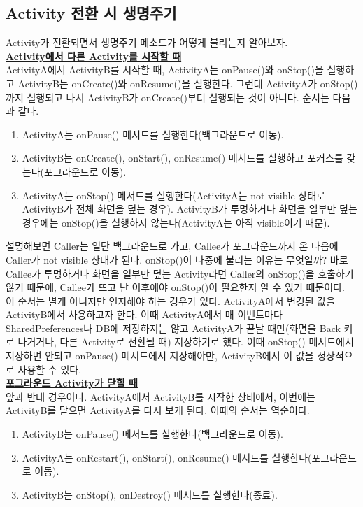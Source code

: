 \subsection{Activity 전환 시 생명주기}
Activity가 전환되면서 생명주기 메소드가 어떻게 불리는지 알아보자.\\

\underline{\bfseries Activity에서 다른 Activity를 시작할 때}\\
ActivityA에서 ActivityB를 시작할 때, ActivityA는 onPause()와 onStop()을 실행하고
ActivityB는 onCreate()와 onResume()을 실행한다.
그런데 ActivityA가 onStop()까지 실행되고 나서 ActivityB가 onCreate()부터 실행되는 것이 아니다.
순서는 다음과 같다.
\begin{enumerate}
\item ActivityA는 onPause() 메서드를 실행한다(백그라운드로 이동).
\item ActivityB는 onCreate(), onStart(), onResume() 메서드를 실행하고 포커스를 갖는다(포그라운드로 이동).
\item ActivityA는 onStop() 메서드를 실행한다(ActivityA는 not visible 상태로 ActivityB가 전체 화면을 덮는 경우). 
ActivityB가 투명하거나 화면을 일부만 덮는 경우에는 onStop()을 실행하지 않는다(ActivityA는 아직 visible이기 때문).
\end{enumerate}

설명해보면 Caller는 일단 백그라운드로 가고, Callee가 포그라운드까지 온 다음에 Caller가 not visible 상태가 된다.
onStop()이 나중에 불리는 이유는 무엇일까? 
바로 Callee가 투명하거나 화면을 일부만 덮는 Activity라면 Caller의 onStop()을 호출하기 않기 때문에, 
Callee가 뜨고 난 이후에야 onStop()이 필요한지 알 수 있기 때문이다.\\

이 순서는 별게 아니지만 인지해야 하는 경우가 있다. 
ActivityA에서 변경된 값을 ActivityB에서 사용하고자 한다.
이때 ActivityA에서 매 이벤트마다 SharedPreferences나 DB에 저장하지는 않고 ActivityA가 끝날 때만(화면을 Back 키로 나거거나, 다른 Activity로 전환될 때) 저장하기로 했다.
이때 onStop() 메서드에서 저장하면 안되고 onPause() 메서드에서 저장해야만, ActivityB에서 이 값을 정상적으로 사용할 수 있다.\\

\underline{\bfseries 포그라운드 Activity가 닫힐 때}\\
앞과 반대 경우이다. 
ActivityA에서 ActivityB를 시작한 상태에서, 이번에는 ActivityB를 닫으면 ActivityA를 다시 보게 된다.
이때의 순서는 역순이다.
\begin{enumerate}
\item ActivityB는 onPause() 메서드를 실행한다(백그라운드로 이동).
\item ActivityA는 onRestart(), onStart(), onResume() 메서드를 실행한다(포그라운드로 이동).
\item ActivityB는 onStop(), onDestroy() 메서드를 실행한다(종료).
\end{enumerate}

